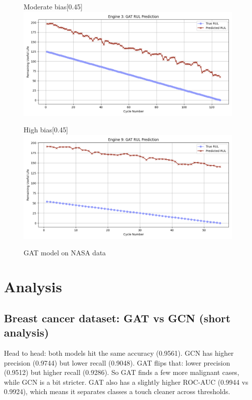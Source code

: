 \documentclass[12pt]{article}
\begin{document}
\begin{figure}[H]
    \begin{subcaptionbox}{Moderate bias\label{fig_NASA_GAT_eng2}}[0.45\textwidth]
        {\includegraphics[width=\linewidth]{figures/NASA/NASA_GAT_eng1.png}}
    \end{subcaptionbox}
    \hfill
    \begin{subcaptionbox}{High bias\label{fig_NASA_GAT_eng3}}[0.45\textwidth]
        {\includegraphics[width=\linewidth]{figures/NASA/NASA_GAT_eng3.png}}
    \end{subcaptionbox}

    \caption{GAT model on NASA data}
    \label{GAT_NASA_all}
\end{figure}


\pagebreak
\section{Analysis} \label{sec_analysis}

\subsection*{Breast cancer dataset: GAT vs GCN (short analysis)}

Head to head: both models hit the same accuracy (0.9561). GCN has higher precision (0.9744) but lower recall (0.9048). GAT flips that: lower precision (0.9512) but higher recall (0.9286). So GAT finds a few more malignant cases, while GCN is a bit stricter. GAT also has a slightly higher ROC-AUC (0.9944 vs 0.9924), which means it separates classes a touch cleaner across thresholds.
\end{document}
